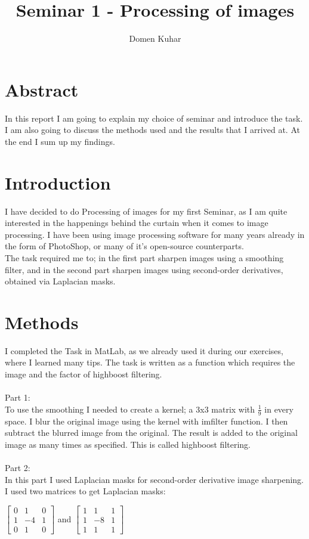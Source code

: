 \documentclass[8pt,letterpaper]{article}
\begin{document}
\title{Seminar 1 - Processing of images}
\author{Domen Kuhar}
\maketitle
	
\section{Abstract}
In this report I am going to explain my choice of seminar and introduce the task. I am also going to discuss the methods used and the results that I arrived at.
At the end I sum up my findings.


\section{Introduction}
I have decided to do Processing of images for my first Seminar, as I am quite interested in the happenings behind the curtain when it comes to image processing.
I have been using image processing software for many years already in the form of PhotoShop, or many of it's open-source counterparts.\\
The task required me to; in the first part sharpen images using a smoothing filter, and in the second part sharpen images using second-order derivatives, obtained via Laplacian masks.


\section{Methods}
I completed the Task in MatLab, as we already used it during our exercises, where I learned many tips. The task is written as a function which requires the image and the factor of highboost filtering.\\ \\
Part 1:\\
To use the smoothing I needed to create a kernel; a 3x3 matrix with \(\frac{1}{9}\) in every space. I blur the original image using the kernel with imfilter function. I then subtract the blurred image from the original.
The result is added to the original image as many times as specified. This is called highboost filtering.\\ \\
Part 2:\\
In this part I used Laplacian masks for second-order derivative image sharpening. I used two matrices to get Laplacian masks:

$\begin{bmatrix}
	0 & 1 & 0\\
	1 & -4 & 1\\
	0 & 1 & 0
\end{bmatrix}$
and
$\begin{bmatrix}
1 & 1 & 1\\
1 & -8 & 1\\
1 & 1 & 1
\end{bmatrix}$ \\
\end{document}

